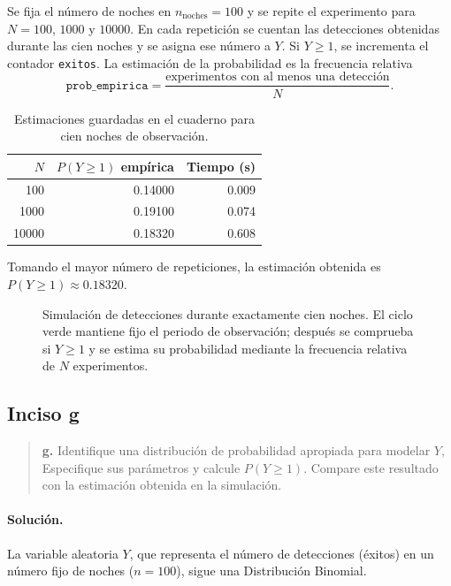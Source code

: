 \documentclass[11pt,a4paper]{article}
\begin{document}
Se fija el número de noches en $n_{\text{noches}}=100$ y se repite el experimento para $N=100$, $1000$ y $10000$. En cada repetición se cuentan las detecciones obtenidas durante las cien noches y se asigna ese número a $Y$. Si $Y\geq1$, se incrementa el contador \texttt{exitos}. La estimación de la probabilidad es la frecuencia relativa
\[
    \texttt{prob\_empirica}
    =\frac{\text{experimentos con al menos una detección}}{N}.
\]

\begin{table}[H]
    \centering
    \caption{Estimaciones guardadas en el cuaderno para cien noches de observación.}
    \label{tab:simulacion-y}
    \begin{tabular}{rrr}
        \toprule
        $N$ & $P(Y\geq1)$ empírica & Tiempo (s)\\
        \midrule
        100   & 0.14000 & 0.009\\
        1000  & 0.19100 & 0.074\\
        10000 & 0.18320 & 0.608\\
        \bottomrule
    \end{tabular}
\end{table}

Tomando el mayor número de repeticiones, la estimación obtenida es $P(Y\geq1)\approx0.18320$.

\begin{figure}[H]
    \centering
    
    \caption{Simulación de detecciones durante exactamente cien noches. El ciclo verde mantiene fijo el periodo de observación; después se comprueba si $Y\geq1$ y se estima su probabilidad mediante la frecuencia relativa de $N$ experimentos.}
    \label{fig:flujo-cien-noches}
\end{figure}

\subsection*{Inciso g}

\begin{quote}
\textbf{g.} Identifique una distribución de probabilidad apropiada para modelar $Y$, Especifique sus parámetros y calcule $P(Y\geq 1)$. Compare este resultado con la estimación obtenida en la simulación.
\end{quote}

\paragraph{Solución.}
La variable aleatoria $Y$, que representa el número de detecciones (éxitos) en un número fijo de noches ($n=100$), sigue una Distribución Binomial.
\end{document}
